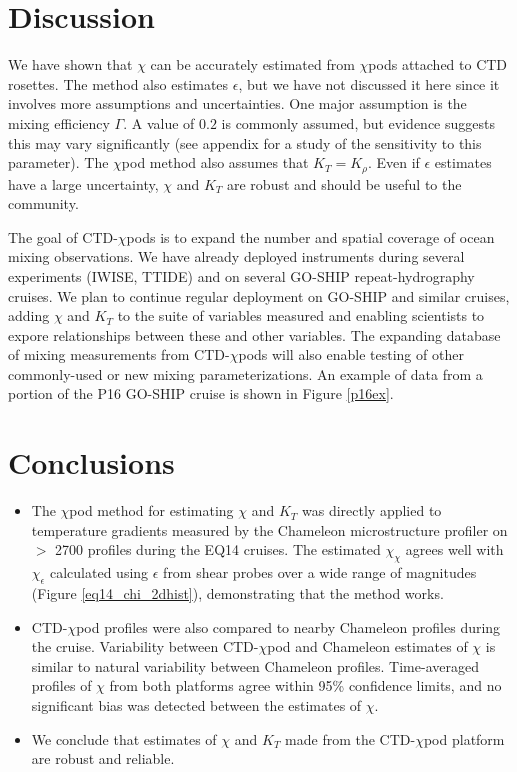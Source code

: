 \documentclass{ametsoc}
\begin{document}
\section{Discussion}

We have shown that $\chi$ can be accurately estimated from $\chi$pods attached to CTD rosettes. The method also estimates $\epsilon$, but we have not discussed it here since it involves more assumptions and uncertainties. One major assumption is the mixing efficiency $\Gamma$. A value of $0.2$ is commonly assumed, but evidence suggests this may vary significantly (see appendix for a study of the sensitivity to this parameter). The $\chi$pod method also assumes that $K_T=K_{\rho}$. Even if $\epsilon$ estimates have a large uncertainty, $\chi$ and $K_T$ are robust and should be useful to the community.

The goal of CTD-$\chi$pods is to expand the number and spatial coverage of ocean mixing observations. We have already deployed instruments during several experiments (IWISE, TTIDE) and on several GO-SHIP repeat-hydrography cruises. We plan to continue regular deployment on GO-SHIP and similar cruises, adding $\chi$ and $K_T$ to the suite of variables measured and enabling scientists to expore relationships between these and other variables. The expanding database of mixing measurements from CTD-$\chi$pods will also enable testing of other commonly-used or new mixing parameterizations. An example of data from a portion of the P16 GO-SHIP cruise is shown in Figure \ref{p16ex}.



\section{Conclusions}

\begin{itemize}
\item The $\chi$pod method for estimating $\chi$ and $K_T$ was directly applied to temperature gradients measured by the Chameleon microstructure profiler on $>$ 2700 profiles during the EQ14 cruises. The estimated $\chi_{\chi}$ agrees well with $\chi_{\epsilon}$ calculated using $\epsilon$ from shear probes over a wide range of magnitudes (Figure \ref{eq14_chi_2dhist}), demonstrating that the method works.
\item CTD-$\chi$pod profiles were also compared to nearby Chameleon profiles during the cruise. Variability between CTD-$\chi$pod and Chameleon estimates of $\chi$ is similar to natural variability between Chameleon profiles. Time-averaged profiles of $\chi$ from both platforms agree within 95\% confidence limits, and no significant bias was detected between the estimates of $\chi$.
\item We conclude that estimates of $\chi$ and $K_T$ made from the CTD-$\chi$pod platform are robust and reliable.
\end{itemize}
\end{document}
